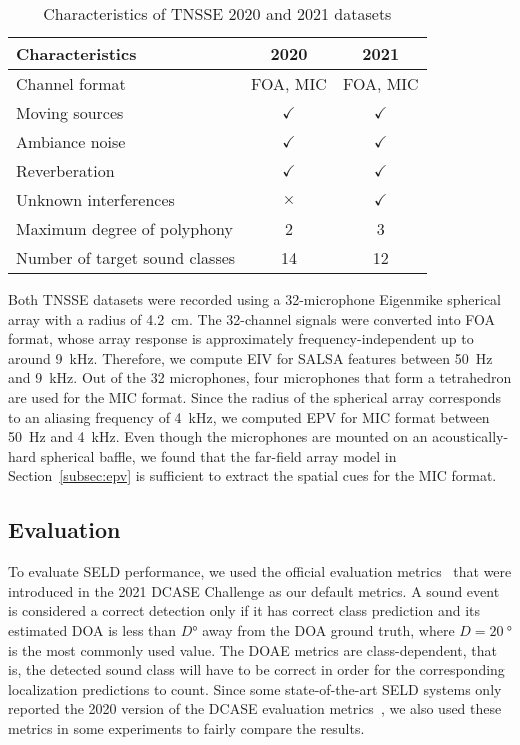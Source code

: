 \documentclass[journal]{IEEEtran}
\newcommand{\V}{$\times$}
\newcommand{\X}{$\checkmark$}
\begin{document}
\begin{table}[t]
    \centering
    \caption {Characteristics of TNSSE 2020 and 2021 datasets}  
    \label{tab:datasets}
    \noindent\begin{tabularx}{\columnwidth}{lCC}
    \toprule
    Characteristics & 2020 & 2021 \\ 
    \midrule
    Channel format                  & FOA, MIC   & FOA, MIC \\
    Moving sources                  & \X    & \X  \\
    Ambiance noise                  & \X    & \X  \\
    Reverberation                   & \X    & \X  \\
    Unknown interferences           & \V    & \X  \\
    Maximum degree of polyphony     & 2     & 3   \\ 
    Number of target sound classes  & 14    & 12  \\
    \bottomrule
    \end{tabularx}
\end{table}

Both TNSSE datasets were recorded using a \num{32}-microphone Eigenmike spherical array with a radius of \SI{4.2}{\centi\meter}. The \num{32}-channel signals were converted into FOA format, whose array response is approximately frequency-independent up to around \SI{9}{\kilo\hertz}. Therefore, we compute EIV for SALSA features between \SI{50}{\hertz} and \SI{9}{\kilo\hertz}. Out of the \num{32} microphones, four microphones that form a tetrahedron are used for the MIC format. Since the radius of the spherical array corresponds to an aliasing frequency of \SI{4}{\kilo\hertz}, we computed EPV for MIC format between \SI{50}{\hertz} and \SI{4}{\kilo\hertz}. Even though the microphones are mounted on an acoustically-hard spherical baffle, we found that the far-field array model in Section~\ref{subsec:epv} is sufficient to extract the spatial cues for the MIC format. 

\subsection{Evaluation}

To evaluate SELD performance, we used the official evaluation metrics~\cite{Politis2020Overview2019} that were introduced in the 2021 DCASE Challenge as our default metrics. 
A sound event is considered a correct detection only if it has correct class prediction and its estimated DOA is less than $D\si{\degree}$ away from the DOA ground truth, where $D=\SI{20}{\degree}$ is the most commonly used value. The DOAE metrics are class-dependent, that is, the detected sound class will have to be correct in order for the corresponding localization predictions to count. Since some state-of-the-art SELD systems only reported the 2020 version of the DCASE evaluation metrics~\cite{Mesaros2019JointEvents}, we also used these metrics in some experiments to fairly compare the results.
\end{document}
